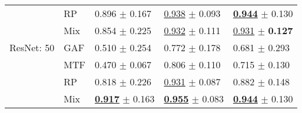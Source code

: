 \begin{tabular}{lllll}
 & RP & \textcolor[rgb]{0.0466101695,0.5000000000,0}{0.896} $\pm$ \textcolor[rgb]{0.6276652573,0.3723347427,0}{0.167} & \underline{\textcolor[rgb]{0.0913404508,0.5000000000,0}{0.938}} $\pm$ \textcolor[rgb]{0.1787248165,0.5000000000,0}{0.093} & \underline{\textbf{\textcolor[rgb]{0.0000000000,0.5000000000,0}{0.944}}} $\pm$ \textcolor[rgb]{0.0148524795,0.5000000000,0}{0.130} \\
 & Mix & \textcolor[rgb]{0.1398305085,0.5000000000,0}{0.854} $\pm$ \textcolor[rgb]{0.8452671150,0.1547328850,0}{0.225} & \underline{\textcolor[rgb]{0.1261368130,0.5000000000,0}{0.932}} $\pm$ \textcolor[rgb]{0.3579032134,0.5000000000,0}{0.111} & \underline{\textcolor[rgb]{0.0526315789,0.5000000000,0}{0.931}} $\pm$ \textbf{\textcolor[rgb]{0.0000000000,0.5000000000,0}{0.127}} \\
ResNet: 50 & GAF & \textcolor[rgb]{0.9104519774,0.0895480226,0}{0.510} $\pm$ \textcolor[rgb]{0.9520028121,0.0479971879,0}{0.254} & \textcolor[rgb]{1.0000000000,0.0000000000,0}{0.772} $\pm$ \textcolor[rgb]{1.0000000000,0.0000000000,0}{0.178} & \textcolor[rgb]{1.0000000000,0.0000000000,0}{0.681} $\pm$ \textcolor[rgb]{1.0000000000,0.0000000000,0}{0.293} \\
 & MTF & \textcolor[rgb]{1.0000000000,0.0000000000,0}{0.470} $\pm$ \textcolor[rgb]{0.2531848418,0.5000000000,0}{0.067} & \textcolor[rgb]{0.8177145117,0.1822854883,0}{0.806} $\pm$ \textcolor[rgb]{0.3482819482,0.5000000000,0}{0.110} & \textcolor[rgb]{0.8684210526,0.1315789474,0}{0.715} $\pm$ \textcolor[rgb]{0.0185218762,0.5000000000,0}{0.130} \\
 & RP & \textcolor[rgb]{0.2203389831,0.5000000000,0}{0.818} $\pm$ \textcolor[rgb]{0.8492077756,0.1507922244,0}{0.226} & \underline{\textcolor[rgb]{0.1304863582,0.5000000000,0}{0.931}} $\pm$ \textcolor[rgb]{0.1279698108,0.5000000000,0}{0.087} & \textcolor[rgb]{0.2368421053,0.5000000000,0}{0.882} $\pm$ \textcolor[rgb]{0.1280590346,0.5000000000,0}{0.148} \\
 & Mix & \underline{\textbf{\textcolor[rgb]{0.0000000000,0.5000000000,0}{0.917}}} $\pm$ \textcolor[rgb]{0.6114994881,0.3885005119,0}{0.163} & \underline{\textbf{\textcolor[rgb]{0.0000000000,0.5000000000,0}{0.955}}} $\pm$ \textcolor[rgb]{0.0859174230,0.5000000000,0}{0.083} & \underline{\textbf{\textcolor[rgb]{0.0000000000,0.5000000000,0}{0.944}}} $\pm$ \textcolor[rgb]{0.0148524795,0.5000000000,0}{0.130} \\
\bottomrule
\end{tabular}

